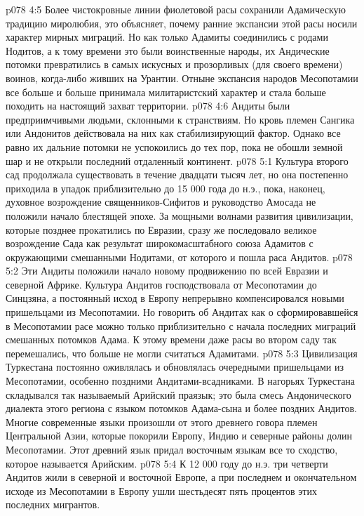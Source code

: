 \vs p078 4:5 \pc Более чистокровные линии фиолетовой расы сохранили Адамическую традицию миролюбия, это объясняет, почему ранние экспансии этой расы носили характер мирных миграций. Но как только Адамиты соединились с родами Нодитов, а к тому времени это были воинственные народы, их Андические потомки превратились в самых искусных и прозорливых (для своего времени) воинов, когда\hyp{}либо живших на Урантии. Отныне экспансия народов Месопотамии все больше и больше принимала милитаристский характер и стала больше походить на настоящий захват территории.
\vs p078 4:6 Андиты были предприимчивыми людьми, склонными к странствиям. Но кровь племен Сангика или Андонитов действовала на них как стабилизирующий фактор. Однако все равно их дальние потомки не успокоились до тех пор, пока не обошли земной шар и не открыли последний отдаленный континент.
\vs p078 5:1 Культура второго сад продолжала существовать в течение двадцати тысяч лет, но она постепенно приходила в упадок приблизительно до 15 000 года до н.э., пока, наконец, духовное возрождение священников\hyp{}Сифитов и руководство Амосада не положили начало блестящей эпохе. За мощными волнами развития цивилизации, которые позднее прокатились по Евразии, сразу же последовало великое возрождение Сада как результат широкомасштабного союза Адамитов с окружающими смешанными Нодитами, от которого и пошла раса Андитов.
\vs p078 5:2 Эти Андиты положили начало новому продвижению по всей Евразии и северной Африке. Культура Андитов господствовала от Месопотамии до Синцзяна, а постоянный исход в Европу непрерывно компенсировался новыми пришельцами из Месопотамии. Но говорить об Андитах как о сформировавшейся в Месопотамии расе можно только приблизительно с начала последних миграций смешанных потомков Адама. К этому времени даже расы во втором саду так перемешались, что больше не могли считаться Адамитами.
\vs p078 5:3 Цивилизация Туркестана постоянно оживлялась и обновлялась очередными пришельцами из Месопотамии, особенно поздними Андитами\hyp{}всадниками. В нагорьях Туркестана складывался так называемый Арийский праязык; это была смесь Андонического диалекта этого региона с языком потомков Адама\hyp{}сына и более поздних Андитов. Многие современные языки произошли от этого древнего говора племен Центральной Азии, которые покорили Европу, Индию и северные районы долин Месопотамии. Этот древний язык придал восточным языкам все то сходство, которое называется Арийским.
\vs p078 5:4 \pc К 12 000 году до н.э. три четверти Андитов жили в северной и восточной Европе, а при последнем и окончательном исходе из Месопотамии в Европу ушли шестьдесят пять процентов этих последних мигрантов.
